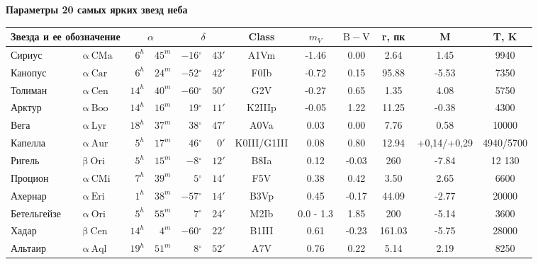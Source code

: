 \documentclass[a4paper,14pt]{article}
\renewcommand{\deg}{\ensuremath{^{\circ}}}
\begin{document}
\newpage
\thispagestyle{empty}
\begin{landscape}

\begin{center}
	\begin{Large}
	\textbf{Параметры 20 самых ярких звезд неба}
	\end{Large}
	

\vspace{0.3cm}
\begin{normalsize}
\begin{tabular}{ll|rr|rr|cccccc}
 \multicolumn{2}{c|}{Звезда и ее обозначение}& \multicolumn{2}{c|}{$\alpha$}& \multicolumn{2}{c|}{$\delta$}& Class& $m_V$ &$\mathrm{B - V}$& r, пк &M & T, K \\
 \hline	
Сириус	&$\mathrm{	\alpha	~	CMa	}$&$	6	^h$&$	45	^m$&$	-16	\deg$&$	43	' $&	A1Vm	&	-1.46	&	0.00	&	2.64	&	1.45	&	9940	\\
Канопус	&$\mathrm{	\alpha	~	Car	}$&$	6	^h$&$	24	^m$&$	-52	\deg$&$	42	' $&	F0Ib    &	-0.72	&	0.15	&	95.88	&	-5.53	&	7350	\\
Толиман	&$\mathrm{	\alpha	~	Cen	}$&$	14	^h$&$	40	^m$&$	-60	\deg$&$	50	' $&	G2V     &	-0.27	&	0.65	&	1.35	&	4.08	&	5750	\\
Арктур	&$\mathrm{	\alpha	~	Boo	}$&$	14	^h$&$	16	^m$&$	19	\deg$&$	11	' $&	K2IIIp 	&	-0.05	&	1.22	&	11.25	&	-0.38	&	4300	\\
Вега	&$\mathrm{	\alpha	~	Lyr	}$&$	18	^h$&$	37	^m$&$	38	\deg$&$	47	' $&	A0Va	&	0.03	&	0.00	&	7.76	&	0.58	&	10000	\\
Капелла	&$\mathrm{	\alpha	~	Aur	}$&$	5	^h$&$	17	^m$&$	46	\deg$&$	0	' $&	K0III/G1III	&	0.08	&	0.80	&	12.94	&	+0,14/+0,29	&	4940/5700	\\
Ригель	&$\mathrm{	\beta	~	Ori	}$&$	5	^h$&$	15	^m$&$	-8	\deg$&$	12	' $&	B8Ia  &	0.12	&	-0.03	&	260	&	-7.84	&	12 130	\\
Процион	&$\mathrm{	\alpha	~	CMi	}$&$	7	^h$&$	39	^m$&$	5	\deg$&$	14	' $&	F5V  	&	0.38	&	0.42	&	3.50	&	2.65	&	6600	\\
Ахернар	&$\mathrm{	\alpha	~	Eri	}$&$	1	^h$&$	38	^m$&$	-57	\deg$&$	14	' $&	B3Vp  	&	0.45	&	-0.17	&	44.09	&	-2.77	&	20000	\\
Бетельгейзе	&$\mathrm{	\alpha	~	Ori	}$&$	5	^h$&$	55	^m$&$	7	\deg$&$	24	' $&	M2Ib  &	0.0 - 1.3	&	1.85	&	200	&	-5.14	&	3600	\\
Хадар	&$\mathrm{	\beta	~	Cen	}$&$	14	^h$&$	4	^m$&$	-60	\deg$&$	22	' $&	B1III       	&	0.61	&	-0.23	&	161.03	&	-5.75	&	28000	\\
Альтаир	&$\mathrm{	\alpha	~	Aql	}$&$	19	^h$&$	51	^m$&$	8	\deg$&$	52	' $&	A7V      	&	0.76	&	0.22	&	5.14	&	2.19	&	8250	\\

\end{tabular}
\end{normalsize}
\end{center}
\end{landscape}
\end{document}
